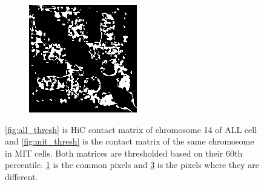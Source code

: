 \documentclass{article}
\begin{document}
\begin{figure}[H]
\begin{subfigure}[b]{.45\textwidth}
        \caption{}
        \label{fig:all_mit_common}
    \end{subfigure}
    \begin{subfigure}[b]{.45\textwidth}
        \includegraphics[width=\textwidth]{figures/ALL_MIT_diff.png}
        \caption{}
        \label{fig:all_mit_diff}
    \end{subfigure}
    \caption{\ref{fig:all_thresh} is HiC contact matrix of 
             chromosome 14 of ALL cell and
             \ref{fig:mit_thresh} is the contact matrix of
             the same chromosome in MIT cells. 
             Both matrices are thresholded based on their 60th
             percentile. \ref{fig:all_mit_common} is the common pixels
             and \ref{fig:all_mit_diff} is the pixels where they 
             are different.}
\end{figure}



\end{document}
